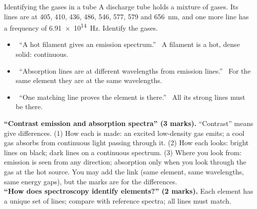 \begin{workedexample}{Identifying the gases in a tube}\label{ch1:we:identify}
A discharge tube holds a mixture of gases. Its lines are at 405, 410, 436, 486, 546, 577, 579
and \qty{656}{nm}, and one more line has a frequency of \qty{6.91e14}{Hz}. Identify the gases.
\end{workedexample}

\begin{mistakes}
\begin{itemize}
  \item \xmark\ ``A hot filament gives an emission spectrum.'' \cmark\ A filament is a hot, dense
        solid: continuous.
  \item \xmark\ ``Absorption lines are at different wavelengths from emission lines.'' \cmark\
        For the same element they are at the same wavelengths.
  \item \xmark\ ``One matching line proves the element is there.'' \cmark\ All its strong lines
        must be there.
\end{itemize}
\end{mistakes}

\begin{examtip}
\textbf{``Contrast emission and absorption spectra'' (3 marks).} ``Contrast'' means give
differences. (1) How each is made: an excited low-density gas emits; a cool gas absorbs from
continuous light passing through it. (2) How each looks: bright lines on black; dark lines on a
continuous spectrum. (3) Where you look from: emission is seen from any direction; absorption
only when you look through the gas at the hot source. You may add the link (same element, same
wavelengths, same energy gaps), but the marks are for the differences.\\[3pt]
\textbf{``How does spectroscopy identify elements?'' (2 marks).} Each element has a unique set of
lines; compare with reference spectra; all lines must match.
\end{examtip}

